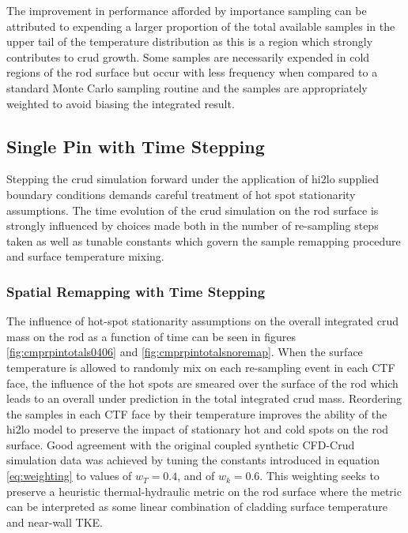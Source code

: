 The improvement in performance afforded by importance sampling can be attributed to expending a larger proportion of the total available samples in the upper tail of the temperature distribution as this is a region which strongly contributes to crud growth.  Some samples are necessarily expended in cold regions of the rod surface but occur with less frequency when compared to a standard Monte Carlo sampling routine and the samples are appropriately weighted to avoid biasing the integrated result.


\subsection{Single Pin with Time Stepping}

Stepping the crud simulation forward under the application of hi2lo supplied boundary conditions demands careful treatment of hot spot stationarity assumptions.  The time evolution of the crud simulation on the rod surface is strongly influenced by choices made both in the number of re-sampling steps taken as well as tunable constants which govern the sample remapping procedure and surface temperature mixing.

\subsubsection{Spatial Remapping with Time Stepping}

The influence of hot-spot stationarity assumptions on the overall integrated crud mass on the rod as a function of time can be seen in figures \ref{fig:cmprpintotals0406} and \ref{fig:cmprpintotalsnoremap}.  When the surface temperature is allowed to randomly mix on each re-sampling event in each CTF face, the influence of the hot spots are smeared over the surface of the rod which leads to an overall under prediction in the total integrated crud mass.  Reordering the samples in each CTF face by their temperature improves the ability of the hi2lo model to preserve the impact of stationary hot and cold spots on the rod surface.  Good agreement with the original coupled synthetic CFD-Crud simulation data was achieved by tuning the constants introduced in equation \ref{eq:weighting} to values of $w_T = 0.4$, and of $w_k = 0.6$.  This weighting seeks to preserve a heuristic thermal-hydraulic metric on the rod surface  where the metric can be interpreted as some linear combination of cladding surface temperature and near-wall TKE. 


